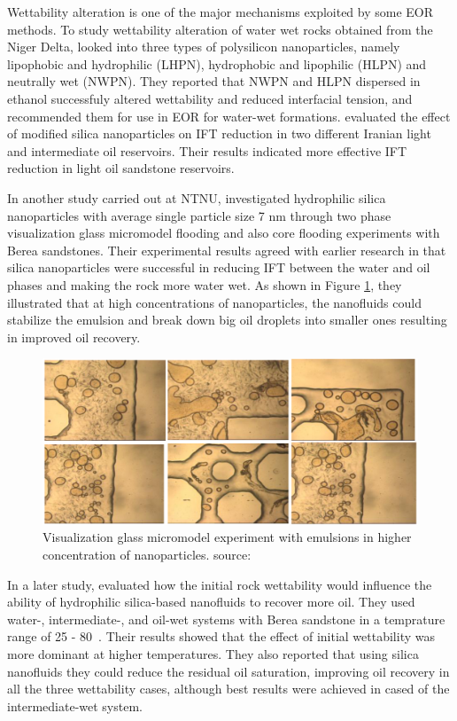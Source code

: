 Wettability alteration  is one of the major mechanisms exploited by some EOR  methods. To study wettability alteration of water wet rocks obtained from the Niger Delta, \citet{Onyekonwu2010} looked into three types of polysilicon nanoparticles, namely lipophobic and hydrophilic (LHPN), hydrophobic and lipophilic (HLPN) and neutrally wet (NWPN). They reported that NWPN and HLPN dispersed in ethanol successfuly altered wettability and reduced interfacial tension, and recommended them for use in EOR for water-wet formations. \citet{Roustaei2013} evaluated the effect of modified silica nanoparticles on IFT reduction in two different Iranian light and intermediate oil reservoirs. Their results indicated more effective IFT reduction in light oil sandstone reservoirs. 

In another study carried out at NTNU, \citet{Li2013} investigated hydrophilic silica nanoparticles with average single particle size 7 nm through two phase visualization glass micromodel flooding and also core flooding experiments with  Berea sandstones. Their experimental results agreed with earlier research in that silica nanoparticles were successful in reducing IFT between the water and oil phases and making the rock more water wet. As shown in Figure \ref{fig:microGlass}, they illustrated that at high concentrations of nanoparticles, the nanofluids could stabilize the emulsion and break down big oil droplets into smaller ones resulting in improved oil recovery.

\begin{figure}[h]
    \centering
    \includegraphics[width=\textwidth]{img/fig/microGlass.png}
    \caption{Visualization glass micromodel experiment with emulsions in higher concentration of nanoparticles. source: \citet{Li2013}}
    \label{fig:microGlass}
\end{figure}

In a later study, \citet{Hendraningrat2014} evaluated how the initial rock wettability would influence the ability of hydrophilic silica-based nanofluids to recover more oil. They used water-, intermediate-, and oil-wet systems with Berea sandstone in a temprature range of 25 - 80~\celsius. Their results showed that the effect of initial wettability was more dominant at higher temperatures. They also reported that using silica nanofluids they could reduce the residual oil saturation, improving oil recovery in all the three wettability cases, although best results were achieved in cased of the intermediate-wet system.   

